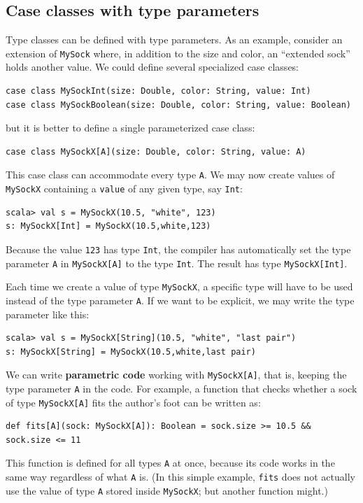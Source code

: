 \subsection{Case classes with type parameters}

Type classes can be defined with type parameters.
As an example, consider an extension of \lstinline!MySock! where,
in addition to the size and color, an \textsf{``}extended sock\textsf{''} holds another
value. We could define several specialized case classes:
\begin{lstlisting}
case class MySockInt(size: Double, color: String, value: Int)
case class MySockBoolean(size: Double, color: String, value: Boolean)
\end{lstlisting}
but it is better to define a single parameterized case class:
\begin{lstlisting}
case class MySockX[A](size: Double, color: String, value: A)
\end{lstlisting}
This case class can accommodate every type \lstinline!A!. We may
now create values of \lstinline!MySockX! containing a \lstinline!value!
of any given type, say \lstinline!Int!:
\begin{lstlisting}
scala> val s = MySockX(10.5, "white", 123)
s: MySockX[Int] = MySockX(10.5,white,123) 
\end{lstlisting}
Because the value \lstinline!123! has type \lstinline!Int!, the
compiler has automatically set the type parameter \lstinline!A! in
\lstinline!MySockX[A]! to the type \lstinline!Int!. The result has
type \lstinline!MySockX[Int]!.

Each time we create a value of type \lstinline!MySockX!, a specific
type will have to be used instead of the type parameter \lstinline!A!.
If we want to be explicit, we may write the type parameter like this:
\begin{lstlisting}
scala> val s = MySockX[String](10.5, "white", "last pair")
s: MySockX[String] = MySockX(10.5,white,last pair) 
\end{lstlisting}

We can write \textbf{parametric code} working
with \lstinline!MySockX[A]!, that is, keeping the type parameter
\lstinline!A! in the code. For example, a function that checks whether
a sock of type \lstinline!MySockX[A]! fits the author\textsf{'}s foot can
be written as:
\begin{lstlisting}
def fits[A](sock: MySockX[A]): Boolean = sock.size >= 10.5 && sock.size <= 11
\end{lstlisting}
This function is defined for all types \lstinline!A! at once, because
its code works in the same way regardless of what \lstinline!A! is.
(In this simple example, \lstinline!fits! does not actually use the
value of type \lstinline!A! stored inside \lstinline!MySockX!; but
another function might.)

